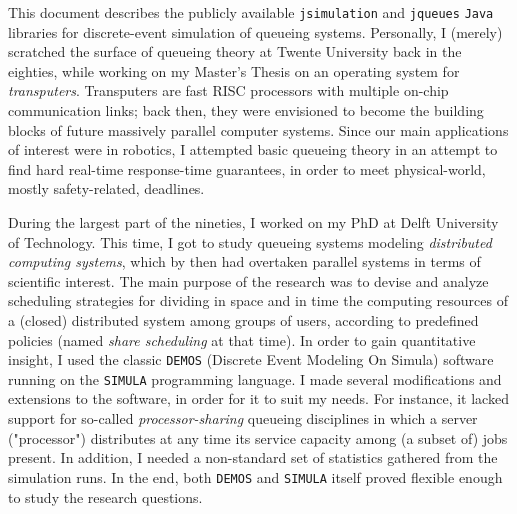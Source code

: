 This document describes the
  publicly available
  \lstinline|jsimulation|
  and \lstinline|jqueues|
  \lstinline|Java|
  libraries for
  discrete-event simulation of queueing systems.
Personally,
  I (merely) scratched the surface of queueing theory
  at Twente University back in the eighties,
  while working on my Master's Thesis
  on an operating system for {\em transputers}.
Transputers are fast RISC processors
  with multiple on-chip communication links;
  back then, they were envisioned to become the building blocks
  of future massively parallel computer systems.
Since our main applications of interest were in robotics,
  I attempted basic queueing theory in an attempt to find
  hard real-time response-time guarantees,
  in order to meet physical-world, mostly safety-related, deadlines.

During the largest part of the nineties,
  I worked on my PhD at Delft University of Technology.
This time,
  I got to study queueing systems modeling
  {\em distributed computing systems},
  which by then had overtaken parallel systems
  in terms of scientific interest.
The main purpose of the research was to devise
  and analyze scheduling strategies for
  dividing in space and in time
  the computing resources of a
  (closed) distributed system among groups of users,
  according to predefined policies (named
  {\em share scheduling\/} at that time).
In order to gain quantitative insight,
  I used the classic \lstinline|DEMOS|
  (Discrete Event Modeling On Simula) software
  running on the \lstinline|SIMULA|
  programming language.
I made several modifications and extensions to the software,
  in order for it to suit my needs.
For instance,
  it lacked support for so-called
  {\em processor-sharing\/}
  queueing disciplines in which
  a server ("processor") distributes
  at any time its service capacity
  among (a subset of) jobs present.
In addition,
  I needed a non-standard set of statistics
  gathered from the simulation runs.
In the end,
  both \lstinline|DEMOS| and \lstinline|SIMULA| itself
  proved flexible enough to study the research questions.

